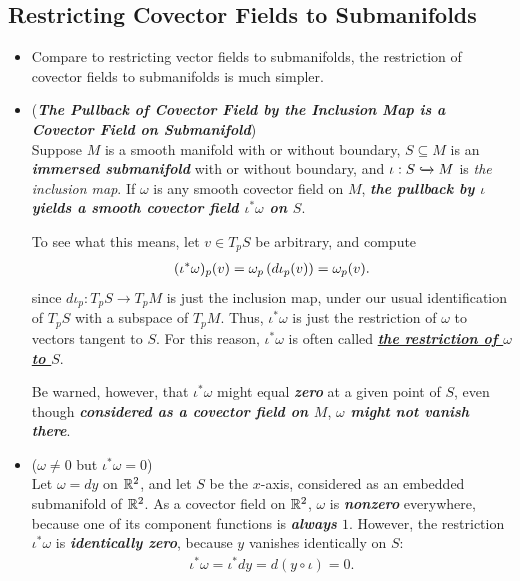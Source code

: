 \documentclass[11pt]{article}
\begin{document}
\subsection{Restricting Covector Fields to Submanifolds}
\begin{itemize}
\item \begin{remark}
Compare to restricting vector fields to submanifolds, the restriction of covector fields to submanifolds is much simpler.
\end{remark}

\item \begin{remark} (\emph{\textbf{The Pullback of Covector Field by the Inclusion Map is a Covector Field on Submanifold}})\\
Suppose $M$ is a smooth manifold with or without boundary, $S \subseteq M$ is an \emph{\textbf{immersed submanifold}} with or without boundary, and $\iota: S \xhookrightarrow{} M$ is \emph{the inclusion map}. If $\omega$ is any smooth covector field on $M$, \emph{\textbf{the pullback by $\iota$ yields a smooth covector
field $\iota^{*}\omega$ on $S$}}. 

To see what this means, let $v \in T_{p}S$ be arbitrary, and compute
\begin{align*}
(\iota^{*}\omega)_p(v) = \omega_p\left(d\iota_p(v)\right) = \omega_p(v).
\end{align*} since $d\iota_p: T_{p}S \rightarrow T_{p}M$ is just the inclusion map, under our usual identification of $T_{p}S$ with a subspace of $T_{p}M$. Thus, $\iota^{*}\omega$ is just the restriction of $\omega$ to vectors tangent to $S$. For this reason, $\iota^{*}\omega$ is often called \underline{\emph{\textbf{the restriction of $\omega$ to $S$}}}. 

Be warned, however, that $\iota^{*}\omega$ might equal \textbf{\emph{zero}} at a given point of $S$, even though \emph{\textbf{considered as a covector field on $M$}}, \emph{\textbf{$\omega$ might not vanish there}}. 
\end{remark}

\item \begin{example} ($\omega \neq 0$ but $\iota^{*}\omega = 0$)\\
Let $\omega = dy$ on ${\mathbb R}^2$, and let $S$ be the $x$-axis, considered as an embedded submanifold of ${\mathbb R}^2$. As a covector field on ${\mathbb R}^2$, $\omega$ is \textbf{\emph{nonzero}} everywhere, because one of its component functions is \emph{\textbf{always} $1$}. However, the restriction $\iota^{*}\omega$ is
\emph{\textbf{identically zero}}, because $y$ vanishes identically on $S$:
\begin{align*}
\iota^{*}\omega = \iota^{*} dy = d(y \circ \iota) = 0.
\end{align*}
\end{example}


\end{itemize}
\end{document}
